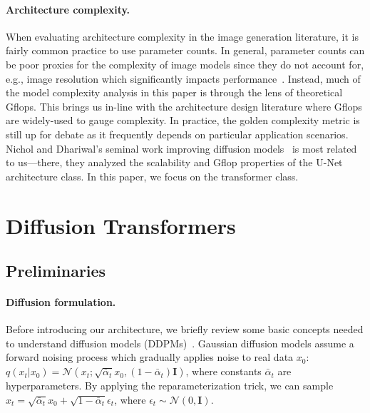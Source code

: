 \documentclass[10pt,twocolumn,letterpaper]{article}
\begin{document}
\vspace{-4mm}
\paragraph{Architecture complexity.}
When evaluating architecture complexity in the image generation literature, it is fairly common practice to use parameter counts. In general, parameter counts can be poor proxies for the complexity of image models since they do not account for, e.g., image resolution which significantly impacts performance~\cite{radosavovic2019network,radosavovic2020designing}. Instead, much of the model complexity analysis in this paper is through the lens of theoretical Gflops. This brings us in-line with the architecture design literature where Gflops are widely-used to gauge complexity. In practice, the golden complexity metric is still up for debate as it frequently depends on particular application scenarios. Nichol and Dhariwal's seminal work improving diffusion models~\cite{nichol2021improved,dhariwal2021adm} is most related to us---there, they analyzed the scalability and Gflop properties of the U-Net architecture class. In this paper, we focus on the transformer class.

\section{Diffusion Transformers}

\subsection{Preliminaries}

\paragraph{Diffusion formulation.} Before introducing our architecture, we briefly review some basic concepts needed to understand diffusion models (DDPMs)~\cite{sohl2015thermodynamics,ho2020ddpm}. Gaussian diffusion models assume a forward noising process which gradually applies noise to real data $x_0$: $q(x_t|x_0) = \mathcal{N}(x_t; \sqrt{\bar{\alpha}_t}x_0, (1 - \bar{\alpha}_t)\mathbf{I})$, where constants $\bar{\alpha}_t$ are hyperparameters. By applying the reparameterization trick, we can sample $x_t = \sqrt{\bar{\alpha}_t}x_0 + \sqrt{1 - \bar{\alpha}_t} \epsilon_t$, where $\epsilon_t\sim\mathcal{N}(0,\mathbf{I})$.
\end{document}
